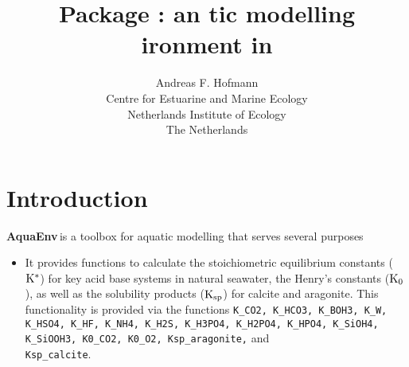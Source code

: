 \documentclass[article,nojss]{jss}
\title{Package \aq: an \noun{Aqua}tic modelling \noun{Env}ironment in \proglang{R}}
\author{Andreas F. Hofmann\\
Centre for Estuarine and Marine Ecology\\
Netherlands Institute of Ecology\\
The Netherlands}
\newcommand{\aq}{\textbf{\textsf{AquaEnv}}}
\begin{document}



\maketitle

\clearpage
\tableofcontents
\clearpage

\section{Introduction}

\aq$\,$is a toolbox for aquatic modelling that serves several purposes
\begin{itemize}
\item It provides functions to calculate the stoichiometric equilibrium constants ($\rm K^*$) for key acid base systems in natural seawater, the Henry's constants ($\rm K_0$), 
      as well as the solubility products ($\rm K_{sp}$) for calcite and aragonite. This functionality is provided via the functions 
      \texttt{K\_CO2, K\_HCO3, K\_BOH3, K\_W, K\_HSO4, K\_HF, K\_NH4, K\_H2S, K\_H3PO4, K\_H2PO4, K\_HPO4, K\_SiOH4, K\_SiOOH3, K0\_CO2, K0\_O2, Ksp\_aragonite,} and \\
      \texttt{Ksp\_calcite}.


\end{itemize}
\end{document}
